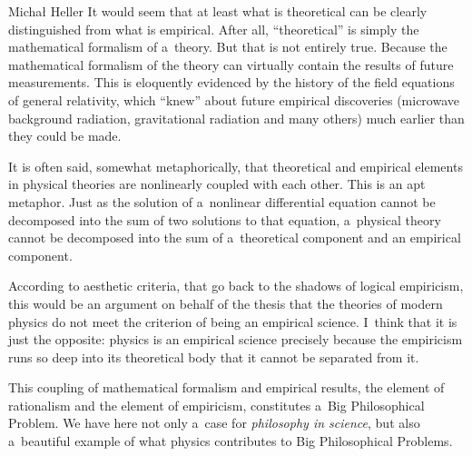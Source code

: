\begin{editorialeng}{Michał Heller}
It would seem that at least what is theoretical can be clearly distinguished from what is empirical. After all, ``theoretical'' is simply the mathematical formalism of a~theory. But that is not entirely true. Because the mathematical formalism of the theory can virtually contain the results of future measurements. This is eloquently evidenced by the history of the field equations of general relativity, which ``knew'' about future empirical discoveries (microwave background radiation, gravitational radiation and many others) much earlier than they could be made.

It is often said, somewhat metaphorically, that theoretical and empirical elements in physical theories are nonlinearly coupled with each other. This is an apt metaphor. Just as the solution of a~nonlinear differential equation cannot be decomposed into the sum of two solutions to that equation, a~physical theory cannot be decomposed into the sum of a~theoretical component and an empirical component.

According to aesthetic criteria, that go back to the shadows of logical empiricism, this would be an argument on behalf of the thesis that the theories of modern physics do not meet the criterion of being an empirical science. I~think that it is just the opposite: physics is an empirical science precisely because the empiricism runs so deep into its theoretical body that it cannot be separated from it.

This coupling of mathematical formalism and empirical results, the element of rationalism and the element of empiricism, constitutes a~Big Philosophical Problem. We have here not only a~case for \textit{philosophy in science}, but also a~beautiful example of what physics contributes to Big Philosophical Problems.


\end{editorialeng}
